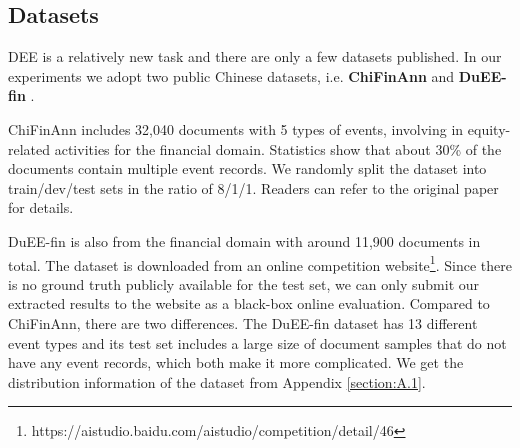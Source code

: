 \documentclass[11pt]{article}
\begin{document}
\begin{table}
\centering\small
{}
\caption{Comparison of event extraction between baselines and our ReDEE model on the DuEE-fin dataset. $\clubsuit$: results from  \cite{PTPCG}.}
\label{tab:dueefin1}
\end{table}

\subsection{Datasets}

DEE is a relatively new task and there are only a few datasets published. In our experiments we adopt two public Chinese datasets, i.e. \textbf{ChiFinAnn} \cite{Doc2EDAG} and \textbf{DuEE-fin} \cite{DuEE-fin}. 

ChiFinAnn includes 32,040 documents with 5 types of events, involving in equity-related activities for the financial domain. Statistics show that about 30\% of the documents contain multiple event records. We randomly split the dataset into train/dev/test sets in the ratio of 8/1/1. Readers can refer to the original paper for details.

DuEE-fin is also from the financial domain with around 11,900 documents in total. The dataset is downloaded from an online competition website\footnote{https://aistudio.baidu.com/aistudio/competition/detail/46}. Since there is no ground truth publicly available for the test set, we can only submit our extracted results to the website as a black-box online evaluation. Compared to ChiFinAnn, there are two differences. The DuEE-fin dataset has 13 different event types and its test set includes a large size of document samples that do not have any event records, which both make it more complicated. We get the distribution information of the dataset from Appendix \ref{section:A.1}.
\end{document}
